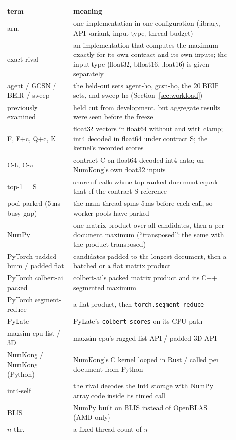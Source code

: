 \begin{small}
\begin{longtable}{p{0.27\linewidth}p{0.66\linewidth}}
\toprule
term & meaning \\
\midrule
\endhead
arm & one implementation in one configuration (library, API variant, input type, thread budget) \\
exact rival & an implementation that computes the maximum exactly for its own contract and its own inputs; the input type (float32, bfloat16, float16) is given separately \\
agent / GCSN / BEIR / sweep & the held-out sets agent-ho, gcsn-ho, the 20 BEIR sets, and sweep-ho (Section~\ref{sec:workload}) \\
previously examined & held out from development, but aggregate results were seen before the freeze \\
F, F+c, Q+c, K & float32 vectors in float64 without and with clamp; int4 decoded in float64 under contract S; the kernel's recorded scores \\
C-b, C-a & contract C on float64-decoded int4 data; on NumKong's own float32 inputs \\
top-1 = S & share of calls whose top-ranked document equals that of the contract-S reference \\
pool-parked (5\,ms busy gap) & the main thread spins 5\,ms before each call, so worker pools have parked \\
NumPy & one matrix product over all candidates, then a per-document maximum (``transposed'': the same with the product transposed) \\
PyTorch padded bmm / padded flat & candidates padded to the longest document, then a batched or a flat matrix product \\
PyTorch colbert-ai packed & colbert-ai's packed matrix product and its C++ segmented maximum \\
PyTorch segment-reduce & a flat product, then \texttt{torch.segment\_reduce} \\
PyLate & PyLate's \texttt{colbert\_scores} on its CPU path \\
maxsim-cpu list / 3D & maxsim-cpu's ragged-list API / padded 3D API \\
NumKong / NumKong (Python) & NumKong's C kernel looped in Rust / called per document from Python \\
int4-self & the rival decodes the int4 storage with NumPy array code inside its timed call \\
BLIS & NumPy built on BLIS instead of OpenBLAS (AMD only) \\
$n$ thr. & a fixed thread count of $n$ \\
\bottomrule
\end{longtable}
\addtocounter{table}{-1}%
\end{small}

